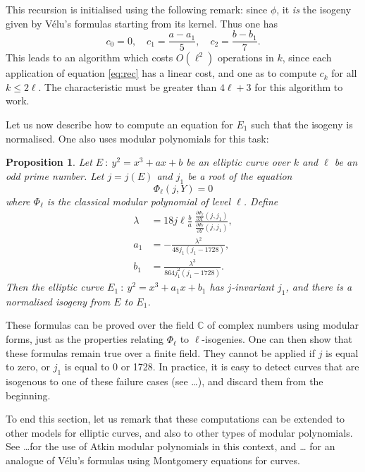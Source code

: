 \documentclass{article}
\newcommand{\C}{\mathbb{C}}
\renewcommand{\v}{\vspace{5mm}}
\newtheorem{prop}[theorem]{Proposition}
\theoremstyle{definition}
\begin{document}
This recursion is initialised using the following remark: since $\phi$,
it \emph{is} the isogeny given by Vélu's formulas starting from its kernel. Thus
one has
\[
c_0 = 0,\quad c_1 = \frac{a - a_1}{5},\quad c_2 = \frac{b - b_1}{7}.
\]
This leads to an algorithm which costs $O(\ell^2)$ operations in $k$, since each
application of equation \ref{eq:rec} has a linear cost, and one as to compute
$c_k$ for all $k\leq 2\ell$. The characteristic must be greater than $4\ell+3$
for this algorithm to work.

Let us now describe how to compute an equation for $E_1$ such that the isogeny
is normalised. One also uses modular polynomials for this task:

\begin{prop}
Let $E\ :\ y^2 = x^3 + ax + b$ be an elliptic curve over $k$
 and $\ell$ be an odd prime number. Let $j = j(E)$ and $j_1$
be a root of the equation
\[
\Phi_\ell(j, Y) = 0
\]
where $\Phi_\ell$ is the classical modular polynomial of level $\ell$.
Define
\begin{equation}
\label{eq:norm}
\begin{aligned}
\lambda &= 18 j \ell \frac{b}{a}\ 
	\frac{\frac{\partial \Phi_\ell}{\partial X}(j, j_1)}
			 {\frac{\partial \Phi_\ell}{\partial Y}(j, j_1)},\\
a_1 &= -\frac{\lambda^2}{48 j_1(j_1 - 1728)},\\
b_1 &= \frac{\lambda^3}{864 j_1^2(j_1 - 1728)}.
\end{aligned}
\end{equation}
Then the elliptic curve $E_1\ :\ y^2 = x^3 + a_1x + b_1$ has $j$-invariant $j_1$,
and there is a normalised isogeny from $E$ to $E_1$.
\end{prop}

These formulas can be proved over the field $\C$ of complex numbers using
modular forms, just as the properties relating $\Phi_\ell$ to $\ell$-isogenies.
One can then show that these formulas remain true over a finite field.
They cannot be applied if $j$ is equal to zero, or $j_1$ is equal to 0
or 1728. In practice, it is easy to detect curves that are isogenous
to one of these failure cases (see \ldots), and discard them from the beginning.

\v
To end this section, let us remark that these computations can be extended to
other models for elliptic curves, and also to other types of modular polynomials.
See \ldots for the use of Atkin modular polynomials in this context, and \ldots
for an analogue of Vélu's formulas using Montgomery equations for curves.
\end{document}

